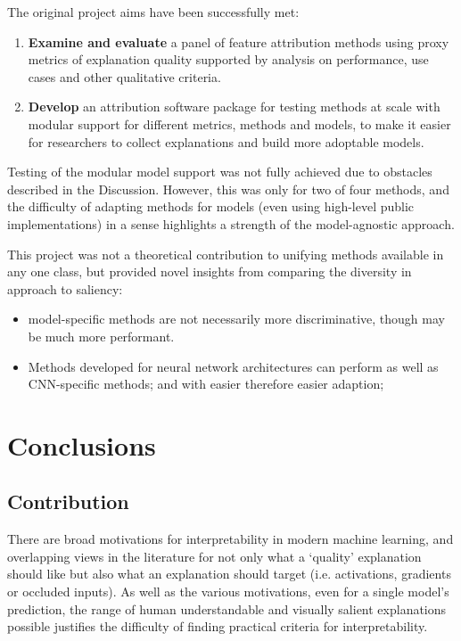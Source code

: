 \documentclass[main]{subfiles}
\begin{document}
The original project aims have been successfully met:
\begin{enumerate}
	\item \textbf{Examine and evaluate} a panel of feature attribution methods using proxy metrics of explanation quality supported by analysis on performance, use cases and other qualitative criteria.

	\item \textbf{Develop} an attribution software package for testing methods at scale with modular support for different metrics, methods and models, to make it easier for researchers to collect explanations and build more adoptable models.

\end{enumerate}
Testing of the modular model support was not fully achieved due to obstacles described in the Discussion. However, this was only for two of four methods, and the difficulty of adapting methods for models (even using high-level public implementations) in a sense highlights a strength of the model-agnostic approach.

This project was not a theoretical contribution to unifying methods available in any one class, but provided novel insights from comparing the diversity in approach to saliency:

\begin{itemize}
\item model-specific methods are not necessarily more discriminative, though may be much more performant.
\item Methods developed for neural network architectures can perform as well as CNN-specific methods; and with easier therefore easier adaption;
\end{itemize}


\chapter{Conclusions}

\section{Contribution}
There are broad motivations for interpretability in modern machine learning, and overlapping views in the literature for not only what a `quality' explanation should like but also what an explanation should target (i.e. activations, gradients or occluded inputs). As well as the various motivations, even for a single model's prediction, the range of human understandable and visually salient explanations possible justifies the difficulty of finding practical criteria for interpretability.
\end{document}
